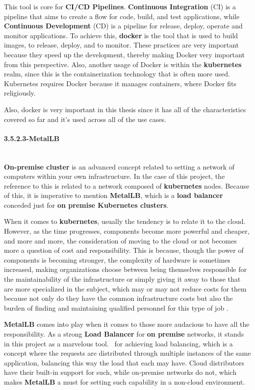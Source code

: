 This tool is core for \textbf{CI/CD Pipelines}. \textbf{Continuous Integration} (CI) is a pipeline that aims to create a flow for code, build, and test applications, while \textbf{Continuous Development} (CD) is a pipeline for release, deploy, operate and monitor applications. To achieve this, \textbf{docker} is the tool that is used to build images, to release, deploy, and to monitor. These practices are very important because they speed up the development, thereby making Docker very important from this perspective. Also, another usage of Docker is within the \textbf{kubernetes} realm, since this is the containerization technology that is often more used. Kubernetes requires Docker because it manages containers, where Docker fits religiously.

Also, docker is very important in this thesis since it has all of the characteristics covered so far and it's used across all of the use cases.

\paragraph{3.5.2.3-MetalLB}\mbox{}\\
\textbf{On-premise cluster} is an advanced concept related to setting a network of computers within your own infrastructure. In the case of this project, the reference to this is related to a network composed of \textbf{kubernetes} nodes. Because of this, it is imperative to mention \textbf{MetalLB}, which is a \textbf{load balancer} conceded just for \textbf{on premise Kubernetes clusters}.

When it comes to \textbf{kubernetes}, usually the tendency is to relate it to the cloud. However, as the time progresses, components become more powerful and cheaper, and more and more, the consideration of moving to the cloud or not becomes more a question of cost and responsibility. This is because, though the power of components is becoming stronger, the complexity of hardware is sometimes increased, making organizations choose between being themselves responsible for the maintainability of the infrastructure or simply giving it away to those that are more specialized in the subject, which may or may not reduce costs for them because not only do they have the common infrastructure costs but also the burden of finding and maintaining qualified personnel for this type of job \cite{onpremice-cloud}.

\textbf{MetalLB} comes into play when it comes to those more audacious to have all the responsibility. As a strong \textbf{Load Balancer} for \textbf{on premise} networks, it stands in this project as a marvelous tool. 
for achieving load balancing, which is a concept where the requests are distributed through multiple instances of the same application, balancing this way the load that each may have. Cloud distributors have their built-in support for such, while on-premise networks do not, which makes \textbf{MetalLB} a must for setting such capability in a non-cloud environment.

